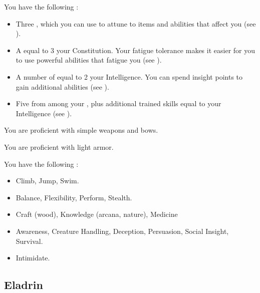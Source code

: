              You have the following :
            \begin{itemize}
                \item Three , which you can use to attune to items and abilities that affect you (see ).
                \item A  equal to 3 \add your Constitution.
                    Your fatigue tolerance makes it easier for you to use powerful abilities that fatigue you (see ).
                \item A number of  equal to 2 \add your Intelligence.
                    You can spend insight points to gain additional abilities (see ).
                \item Five  from among your , plus additional trained skills equal to your Intelligence (see ).
            \end{itemize}

            You are proficient with simple weapons and bows.

            You are proficient with light armor.

            You have the following :
            \begin{itemize}
                \item {} Climb, Jump, Swim.
                \item {} Balance, Flexibility, Perform, Stealth.
                \item {} Craft (wood), Knowledge (arcana, nature), Medicine
                \item {} Awareness, Creature Handling, Deception, Persuasion, Social Insight, Survival.
                \item {} Intimidate.
            \end{itemize}

    \subsection{Eladrin}

